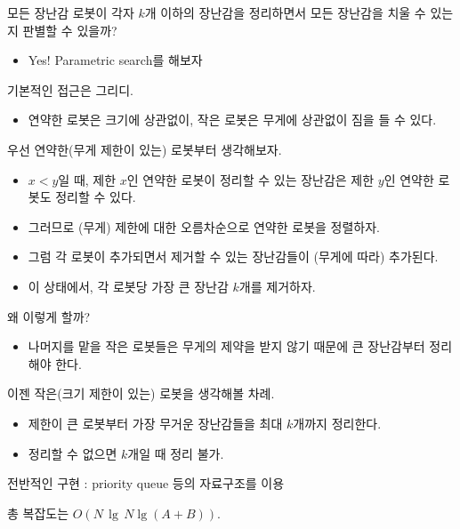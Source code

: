 \documentclass[hyperref={unicode}]{beamer}
\begin{document}
 
    \begin{frame}
         모든 장난감 로봇이 각자 $ k $개 이하의 장난감을 정리하면서 모든 장난감을 치울 수 있는지 판별할 수 있을까?
        \begin{itemize}
            \item<2-> Yes! Parametric search를 해보자
        \end{itemize}
         기본적인 접근은 그리디.
        \begin{itemize}
            \item<4-> 연약한 로봇은 크기에 상관없이, 작은 로봇은 무게에 상관없이 짐을 들 수 있다. 
        \end{itemize}
    \end{frame}
    
    \begin{frame}
         우선 연약한(무게 제한이 있는) 로봇부터 생각해보자.
        \begin{itemize}
            \item<2-> $ x < y$일 때, 제한 $ x $인 연약한 로봇이 정리할 수 있는 장난감은 제한 $ y $인 연약한 로봇도 정리할 수 있다.
            \item<3-> 그러므로 (무게) 제한에 대한 오름차순으로 연약한 로봇을 정렬하자.
            \item<4-> 그럼 각 로봇이 추가되면서 제거할 수 있는 장난감들이 (무게에 따라) 추가된다.
            \item<5-> 이 상태에서, 각 로봇당 가장 큰 장난감 $ k $개를 제거하자.
        \end{itemize}
        
    \end{frame}
    
    \begin{frame}
         왜 이렇게 할까?
            \begin{itemize}
            \item<2-> 나머지를 맡을 작은 로봇들은 무게의 제약을 받지 않기 때문에 큰 장난감부터 정리해야 한다. 
            \end{itemize}
         이젠 작은(크기 제한이 있는) 로봇을 생각해볼 차례.
        \begin{itemize}
            \item<4-> 제한이 큰 로봇부터 가장 무거운 장난감들을 최대 $ k $개까지 정리한다.
            \item<5-> 정리할 수 없으면 $ k $개일 때 정리 불가.
        \end{itemize}
         전반적인 구현 : priority queue 등의 자료구조를 이용
        
         총 복잡도는 $ O(N\, \lg\, N \lg(A+B)) $.
    \end{frame}
    
\end{document}
